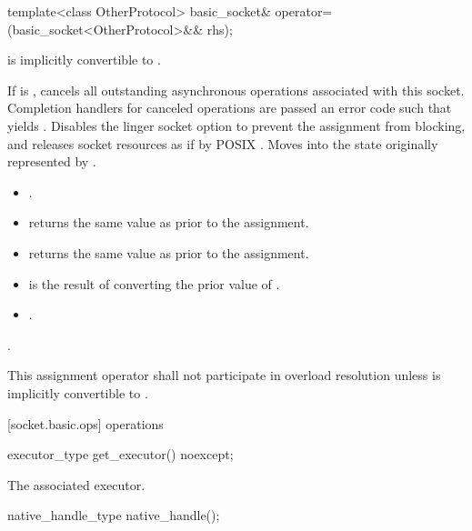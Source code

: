 \begin{itemdecl}
template<class OtherProtocol>
  basic_socket& operator=(basic_socket<OtherProtocol>&& rhs);
\end{itemdecl}

\begin{itemdescr}
\pnum
\requires {} is implicitly convertible to .

\pnum
\effects If  is , cancels all outstanding asynchronous operations associated with this socket. Completion handlers for canceled operations are passed an error code  such that  yields . Disables the linger socket option to prevent the assignment from blocking, and releases socket resources as if by POSIX . Moves into  the state originally represented by .

\pnum
\postconditions
\begin{itemize}
\item
{}.
\item
{} returns the same value as  prior to the assignment.
\item
{} returns the same value as  prior to the assignment.
\item
{} is the result of converting the prior value of .
\item
{}.
\end{itemize}

\pnum
\returns {}.

\pnum
\remarks This assignment operator shall not participate in overload resolution unless  is implicitly convertible to .
\end{itemdescr}



[socket.basic.ops]{ operations}

\begin{itemdecl}
executor_type get_executor() noexcept;
\end{itemdecl}

\begin{itemdescr}
\pnum
\returns The associated executor.
\end{itemdescr}

\begin{itemdecl}
native_handle_type native_handle();
\end{itemdecl}

